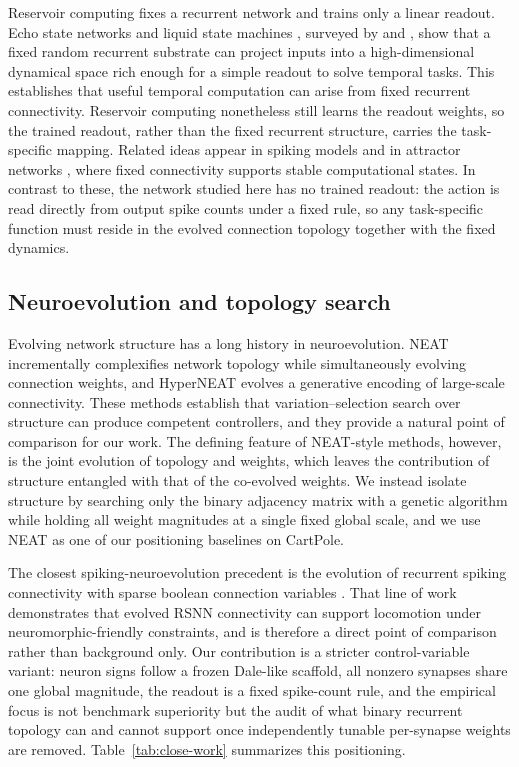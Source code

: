 \documentclass[10pt]{article}
\begin{document}
Reservoir computing fixes a recurrent network and trains only a linear readout.
Echo state networks \citep{jaeger2001} and liquid state machines
\citep{maass2002}, surveyed by \citet{lukosevicius2009} and \citet{tanaka2019},
show that a fixed random recurrent substrate can project inputs into a
high-dimensional dynamical space rich enough for a simple readout to solve
temporal tasks. This establishes that useful temporal computation can arise
from fixed recurrent connectivity. Reservoir computing nonetheless still learns
the readout weights, so the trained readout, rather than the fixed recurrent
structure, carries the task-specific mapping. Related ideas appear in spiking
models \citep{maass1997,gerstner2014} and in attractor networks
\citep{hopfield1982}, where fixed connectivity supports stable computational
states. In contrast to these, the network studied here has no trained readout:
the action is read directly from output spike counts under a fixed rule, so any
task-specific function must reside in the evolved connection topology together
with the fixed dynamics.

\subsection{Neuroevolution and topology search}

Evolving network structure has a long history in neuroevolution. NEAT
\citep{stanley2002} incrementally complexifies network topology while
simultaneously evolving connection weights, and HyperNEAT \citep{stanley2009}
evolves a generative encoding of large-scale connectivity. These methods
establish that variation--selection search over structure can produce competent
controllers, and they provide a natural point of comparison for our work. The
defining feature of NEAT-style methods, however, is the joint evolution of
topology and weights, which leaves the contribution of structure entangled with
that of the co-evolved weights. We instead isolate structure by searching only
the binary adjacency matrix with a genetic algorithm \citep{holland1992,eiben2015}
while holding all weight magnitudes at a single fixed global scale, and we use
NEAT as one of our positioning baselines on CartPole.

The closest spiking-neuroevolution precedent is the evolution of recurrent
spiking connectivity with sparse boolean connection variables
\citep{wang2023}. That line of work demonstrates that evolved RSNN connectivity
can support locomotion under neuromorphic-friendly constraints, and is therefore
a direct point of comparison rather than background only. Our contribution is a
stricter control-variable variant: neuron signs follow a frozen Dale-like
scaffold, all nonzero synapses share one global magnitude, the readout is a
fixed spike-count rule, and the empirical focus is not benchmark superiority but
the audit of what binary recurrent topology can and cannot support once
independently tunable per-synapse weights are removed. Table~\ref{tab:close-work}
summarizes this positioning.
\end{document}
